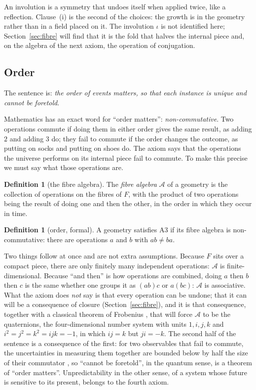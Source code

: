 \documentclass[11pt,a4paper]{article}
\theoremstyle{plain}
\theoremstyle{definition}
\newtheorem{definition}[theorem]{Definition}
\theoremstyle{remark}
\begin{document}
An involution is a symmetry that undoes itself when applied twice, like a reflection. Clause~(i) is the second of the choices: the growth is in the geometry rather than in a field placed on it. The involution $\iota$ is not identified here; Section~\ref{sec:fibre} will find that it is the fold that halves the internal piece and, on the algebra of the next axiom, the operation of conjugation.

\subsection{Order}\label{sec:A3}

The sentence is: \emph{the order of events matters, so that each instance is unique and cannot be foretold}.

Mathematics has an exact word for ``order matters'': \emph{non-commutative}. Two operations commute if doing them in either order gives the same result, as adding $2$ and adding $3$ do; they fail to commute if the order changes the outcome, as putting on socks and putting on shoes do. The axiom says that the operations the universe performs on its internal piece fail to commute. To make this precise we must say what those operations are.

\begin{definition}[the fibre algebra]\label{def:fibrealg}
The \emph{fibre algebra} $\mathcal{A}$ of a geometry is the collection of operations on the fibres of $F$, with the product of two operations being the result of doing one and then the other, in the order in which they occur in time.
\end{definition}

\begin{definition}[order, formal]\label{def:A3}
A geometry satisfies A3 if its fibre algebra is non-commutative: there are operations $a$ and $b$ with $ab\neq ba$.
\end{definition}

Two things follow at once and are not extra assumptions. Because $F$ sits over a compact piece, there are only finitely many independent operations: $\mathcal{A}$ is finite-dimensional. Because ``and then'' is how operations are combined, doing $a$ then $b$ then $c$ is the same whether one groups it as $(ab)c$ or $a(bc)$: $\mathcal{A}$ is associative. What the axiom does \emph{not} say is that every operation can be undone; that it can will be a consequence of closure (Section~\ref{sec:fibre}), and it is that consequence, together with a classical theorem of Frobenius \cite{Frobenius1878}, that will force $\mathcal{A}$ to be the quaternions, the four-dimensional number system with units $1,i,j,k$ and $i^{2}=j^{2}=k^{2}=ijk=-1$, in which $ij=k$ but $ji=-k$. The second half of the sentence is a consequence of the first: for two observables that fail to commute, the uncertainties in measuring them together are bounded below by half the size of their commutator \cite{Robertson1929}, so ``cannot be foretold'', in the quantum sense, is a theorem of ``order matters''. Unpredictability in the other sense, of a system whose future is sensitive to its present, belongs to the fourth axiom.
\end{document}
